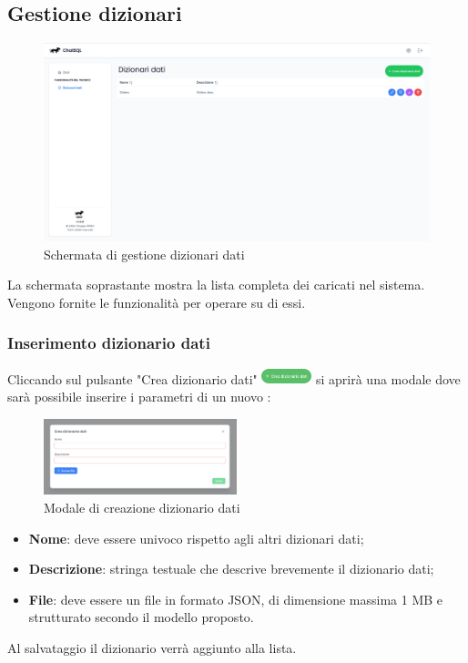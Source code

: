 \subsection{Gestione dizionari}
\begin{figure}[H]
  \centering
  \includegraphics[width=1\textwidth]{assets/dd_list.png}
  \caption{Schermata di gestione dizionari dati}
\end{figure}
\par La schermata soprastante mostra la lista completa dei  caricati nel sistema. Vengono fornite le funzionalità per operare su di essi.

\subsubsection{Inserimento dizionario dati}
Cliccando sul pulsante "Crea dizionario dati" \includegraphics[height=1.2em]{assets/dd_create_button.png} si aprirà una modale dove sarà possibile inserire i parametri di un nuovo :
\begin{figure}[H]
  \centering
  \includegraphics[width=0.5\textwidth]{assets/dd_modal_create.png}
  \caption{Modale di creazione dizionario dati}
\end{figure}
\begin{itemize}
  \item \textbf{Nome}: deve essere univoco rispetto agli altri dizionari dati;
  \item \textbf{Descrizione}: stringa testuale che descrive brevemente il dizionario dati;
  \item \textbf{File}: deve essere un file in formato JSON, di dimensione massima 1 MB e strutturato secondo il modello proposto.
\end{itemize}
\vspace{0.5\baselineskip}
\par Al salvataggio il dizionario verrà aggiunto alla lista.

